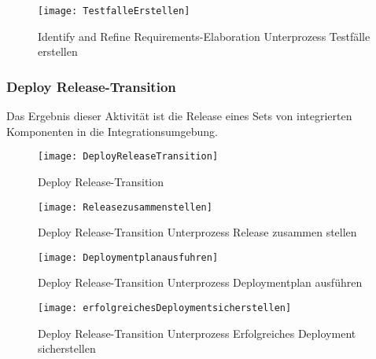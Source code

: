 \begin{figure}[!htbp]
\begin{center}
  \texttt{[image: TestfalleErstellen]} %
  \caption{Identify and Refine Requirements-Elaboration Unterprozess Testfälle erstellen}
  \label{fig:TestfalleErstellen}
\end{center}
\end{figure}

\subsubsection{Deploy Release-Transition}


Das Ergebnis dieser Aktivität ist die Release eines Sets von integrierten Komponenten in die Integrationsumgebung. 
\begin{figure}[!htbp]
\begin{center}
  \texttt{[image: DeployReleaseTransition]} %
  \caption{Deploy Release-Transition}
  \label{fig:DeployRelease}
\end{center}
\end{figure}

\begin{figure}[!htbp]
\begin{center}
  \texttt{[image: Releasezusammenstellen]} %
  \caption{Deploy Release-Transition Unterprozess Release zusammen stellen}
  \label{fig:Releasezusammenstellen}
\end{center}
\end{figure}

\begin{figure}[!htbp]
\begin{center}
  \texttt{[image: Deploymentplanausfuhren]} %
  \caption{Deploy Release-Transition Unterprozess Deploymentplan ausführen}
  \label{fig:Deploymentplanausfuhren}
\end{center}
\end{figure}

\begin{figure}[!htbp]
\begin{center}
  \texttt{[image: erfolgreichesDeploymentsicherstellen]} %
  \caption{Deploy Release-Transition Unterprozess Erfolgreiches Deployment sicherstellen}
  \label{fig:erfolgreichesDeploymentsicherstellen}
\end{center}
\end{figure}

